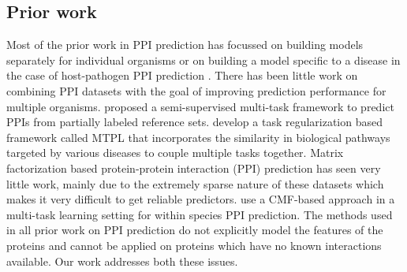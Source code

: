 \documentclass[runningheads,a4paper]{llncs}
\begin{document}
\subsection{Prior work}
Most of the prior work in PPI prediction has focussed on building models separately for individual 
organisms \citep{chen,yeast,struct2net,qi06} or on building a model specific to a disease in the case of host-pathogen PPI 
prediction \citep{tastan09,qi09,dyer07,me12}. There has been little work on combining PPI datasets with the goal of improving 
prediction performance for multiple organisms. \cite{qi2010} proposed a semi-supervised multi-task framework to predict PPIs from partially labeled reference sets. \cite{me_ismb_2013} develop a task regularization based
framework called MTPL that incorporates the similarity in biological pathways targeted by various diseases to 
couple multiple tasks together. Matrix factorization based protein-protein interaction (PPI) prediction has seen very little work, mainly due to the extremely sparse nature of these datasets which makes it very difficult to get reliable predictors. \cite{ppi_cmf} use a CMF-based approach in a multi-task learning setting for within species PPI prediction. The methods used 
in all prior work on PPI prediction do not explicitly model the features of the proteins and cannot be applied on proteins which have no known interactions available. Our work addresses both these issues.
\end{document}
